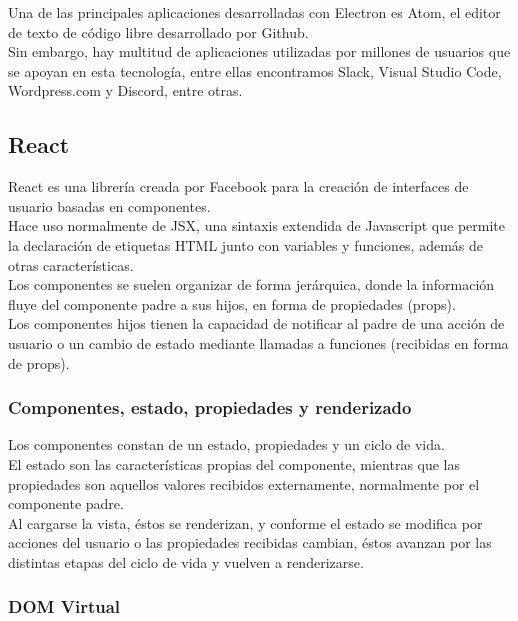 Una de las principales aplicaciones desarrolladas con Electron es Atom, el editor de texto de código libre desarrollado por Github. \\ Sin embargo, hay multitud de aplicaciones utilizadas por millones de usuarios que se apoyan en esta tecnología, entre ellas encontramos Slack, Visual Studio Code, Wordpress.com y Discord, entre otras. \\

\subsection {React}

React es una librería creada por Facebook para la creación de interfaces de usuario basadas en componentes. \\
Hace uso normalmente de JSX, una sintaxis extendida de Javascript que permite la declaración de etiquetas HTML junto con variables y funciones, además de otras características. \\

Los componentes se suelen organizar de forma jerárquica, donde la información fluye del componente padre a sus hijos, en forma de propiedades (props). \\ Los componentes hijos tienen la capacidad de notificar al padre de una acción de usuario o un cambio de estado mediante llamadas a funciones (recibidas en forma de props).\\

\subsubsection {Componentes, estado, propiedades y renderizado}

Los componentes constan de un estado, propiedades y un ciclo de vida. \\ 
El estado son las características propias del componente, mientras que las propiedades son aquellos valores recibidos externamente, normalmente por el componente padre. \\
Al cargarse la vista, éstos se renderizan, y conforme el estado se modifica por acciones del usuario o las propiedades recibidas cambian, éstos avanzan por las distintas etapas del ciclo de vida y vuelven a renderizarse. \\

\subsubsection {DOM Virtual}

